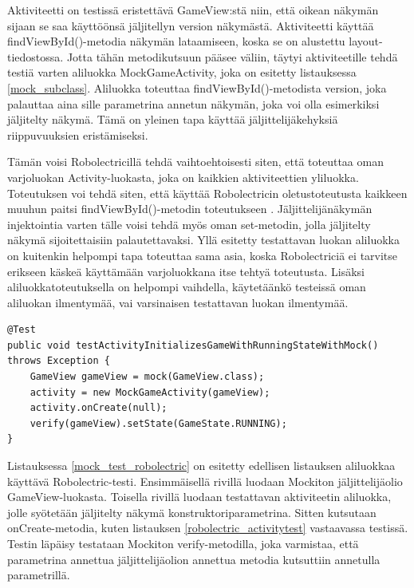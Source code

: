 Aktiviteetti on testissä eristettävä GameView:stä niin, että oikean näkymän sijaan se saa käyttöönsä jäljitellyn version näkymästä. Aktiviteetti käyttää findViewById()-metodia näkymän lataamiseen, koska se on alustettu layout-tiedostossa. Jotta tähän metodikutsuun pääsee väliin, täytyi aktiviteetille tehdä testiä varten aliluokka MockGameActivity, joka on esitetty listauksessa \ref{mock_subclass}. Aliluokka toteuttaa findViewById()-metodista version, joka palauttaa aina sille parametrina annetun näkymän, joka voi olla esimerkiksi jäljitelty näkymä. Tämä on yleinen tapa käyttää jäljittelijäkehyksiä riippuvuuksien eristämiseksi.

Tämän voisi Robolectricillä tehdä vaihtoehtoisesti siten, että toteuttaa oman varjoluokan Activity-luokasta, joka on kaikkien aktiviteettien yliluokka. Toteutuksen voi tehdä siten, että käyttää Robolectricin oletustoteutusta kaikkeen muuhun paitsi findViewById()-metodin toteutukseen \cite{robolectric}. Jäljittelijänäkymän injektointia varten tälle voisi tehdä myös oman set-metodin, jolla jäljitelty näkymä sijoitettaisiin palautettavaksi. Yllä esitetty testattavan luokan aliluokka on kuitenkin helpompi tapa toteuttaa sama asia, koska Robolectriciä ei tarvitse erikseen käskeä käyttämään varjoluokkana itse tehtyä toteutusta. Lisäksi aliluokkatoteutuksella on helpompi vaihdella, käytetäänkö testeissä oman aliluokan ilmentymää, vai varsinaisen testattavan luokan ilmentymää.

\begin{lstlisting}[float,label=mock_test_robolectric, caption=Jäljittelyä käyttävä testi Robolectrcicillä]
@Test
public void testActivityInitializesGameWithRunningStateWithMock() throws Exception {
	GameView gameView = mock(GameView.class);
	activity = new MockGameActivity(gameView);
	activity.onCreate(null);
	verify(gameView).setState(GameState.RUNNING);
}
\end{lstlisting}

Listauksessa \ref{mock_test_robolectric} on esitetty edellisen listauksen aliluokkaa käyttävä Robolectric-testi. Ensimmäisellä rivillä luodaan Mockiton jäljittelijäolio GameView-luokasta. Toisella rivillä luodaan testattavan aktiviteetin aliluokka, jolle syötetään jäljitelty näkymä konstruktoriparametrina. Sitten kutsutaan onCreate-metodia, kuten listauksen \ref{robolectric_activitytest} vastaavassa testissä. Testin läpäisy testataan Mockiton verify-metodilla, joka varmistaa, että parametrina annettua jäljittelijäolion annettua metodia kutsuttiin annetulla parametrillä.

